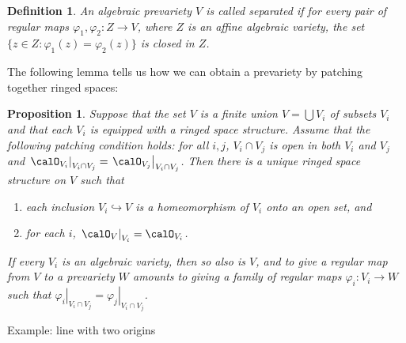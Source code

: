 \documentclass[12pt]{amsart}
\theoremstyle{plain}
\newtheorem{definition}[theorem]{Definition}
\newtheorem{proposition}[theorem]{Proposition}
\begin{document}
\begin{definition}
An algebraic prevariety $V$ is called separated if for every pair of regular maps $\varphi_1, \varphi_2 : Z \to V$, where $Z$ is an affine algebraic variety, the set $\{z \in Z : \varphi_1(z) = \varphi_2(z)\}$ is closed in $Z$.
\end{definition}

The following lemma tells us how we can obtain a prevariety by patching together ringed spaces:

\begin{proposition}
Suppose that the set $V$ is a finite union $V = \bigcup V_i$  of subsets $V_i$ and that each $V_i$ is equipped with a ringed space structure.
Assume that the following patching condition holds: for all $i,j$, $V_i \cap V_j$ is open in both $V_i$ and $V_j$ and $\left. \calO_{V_i} \right|_{V_i \cap V_j} = \left. \calO_{V_j} \right|_{V_i \cap V_j}$.
Then there is a unique ringed space structure on $V$ such that
\begin{enumerate}
\item
each inclusion $V_i \hookrightarrow V$ is a homeomorphism of $V_i$ onto an open set, and

\item
for each $i$, $\left. \calO_V \right|_{V_i} = \calO_{V_i}$.
\end{enumerate}
If every $V_i$ is an algebraic variety, then so also is $V$, and to give a regular map from $V$ to a prevariety $W$ amounts to giving a family of regular maps $\varphi_i : V_i \to W$ such that $\left. \varphi_i \right|_{V_i \cap V_j} = \left. \varphi_j \right|_{V_i \cap V_j}$.
\end{proposition}

Example: line with two origins
\end{document}
